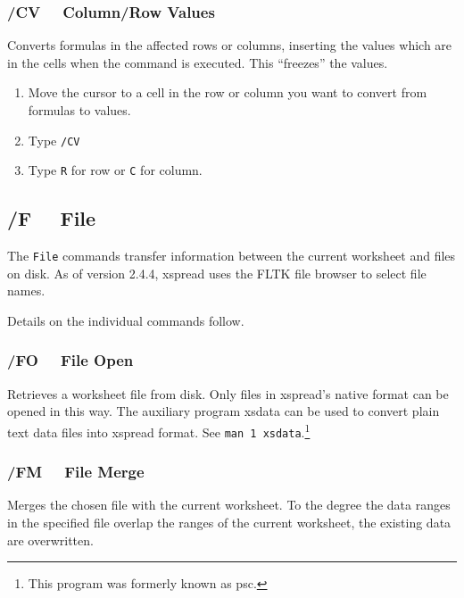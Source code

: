 \documentclass[titlepage]{article}
\begin{document}
\subsubsection{/CV \ \     Column/Row Values}

Converts formulas in the affected rows or columns, inserting the
values which are in the cells when the command is executed.  This
``freezes'' the values.  

\usage{}
\begin{enumerate}\itemsep -2pt
\item Move the cursor to a cell in the row or column you want to
  convert from formulas to values.
\item Type \texttt{/CV}
\item Type \texttt{R} for row or \texttt{C} for column.
\end{enumerate}

\subsection[File Commands]{/F  \ \     File}
        
The \texttt{File} commands transfer information between the current worksheet
and files on disk.  As of version 2.4.4, \textsf{xspread} uses the
FLTK file browser to select file names.

Details on the individual commands follow.

        
\subsubsection{/FO \ \     File Open}

Retrieves a worksheet file from disk.  Only files in
\textsf{xspread}'s native format can be opened in this way.  The
auxiliary program \textsf{xsdata} can be used to convert plain text data
files into \textsf{xspread} format.  See \texttt{man 1
  xsdata}.\footnote{This program was formerly known as \textsf{psc}.}

\subsubsection{/FM \ \     File Merge}

Merges the chosen file with the current worksheet.  To the degree
the data ranges in the specified file overlap the ranges of the
current worksheet, the existing data are overwritten.
\end{document}
